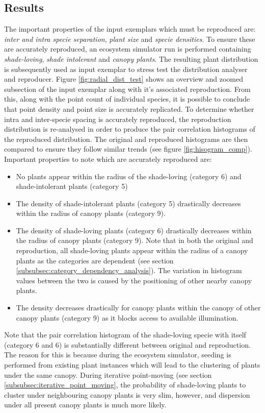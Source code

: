 \subsection{Results}

The important properties of the input exemplars which must be reproduced are: \textit{inter and intra specie separation}, \textit{plant size} and \textit{specie densities}. To ensure these are accurately reproduced, an ecosystem simulator run is performed containing \textit{shade-loving}, \textit{shade intolerant} and \textit{canopy plants}. The resulting plant distribution is subsequently used as input exemplar to stress test the distribution analyser and reproducer. Figure \ref{fig:radial_dist_test} shows an overview and zoomed subsection of the input exemplar along with it's associated reproduction. From this, along with the point count of individual species, it is possible to conclude that point density and point size is accurately replicated. To determine whether intra and inter-specie spacing is accurately reproduced, the reproduction distribution is re-analysed in order to produce the pair correlation histograms of the reproduced distribution. The original and reproduced histograms are then compared to ensure they follow similar trends (see figure \ref{fig:hisogram_comp}). Important properties to note which are accurately reproduced are:
\begin{itemize}
\item No plants appear within the radius of the shade-loving (category 6) and shade-intolerant plants (category 5)
\item The density of shade-intolerant plants (category 5) drastically decreases within the radius of canopy plants (category 9).
\item The density of shade-loving plants (category 6) drastically decreases within the radius of canopy plants (category 9). Note that in both the original and reproduction, all shade-loving plants appear within the radius of a canopy plants as the categories are dependent (see section \ref{subsubsec:category_dependency_analysis}). The variation in histogram values between the two is caused by the positioning of other nearby canopy plants.
\item The density decreases drastically for canopy plants within the canopy of other canopy plants (category 9) as it blocks access to available illumination.
\end{itemize}

Note that the pair correlation histogram of the shade-loving specie with itself (category 6 and 6) is substantially different between original and reproduction. The reason for this is because during the ecosystem simulator, seeding is performed from existing plant instances which will lead to the clustering of plants under the same canopy. During iterative point-moving (see section \ref{subsubsec:iterative_point_moving}, the probability of shade-loving plants to cluster under neighbouring canopy plants is very slim, however, and dispersion under all present canopy plants is much more likely.

